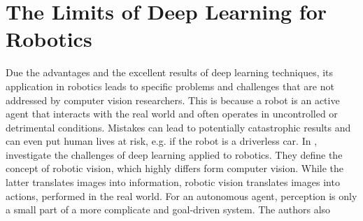 \section{The Limits of Deep Learning for Robotics}
 
 Due the advantages and the excellent results of deep learning techniques, its application in robotics leads to specific problems and challenges that are not addressed by computer vision researchers. This is because a robot is an active agent that interacts with the real world and often operates in uncontrolled or detrimental conditions. Mistakes can lead to potentially catastrophic results and can even put human lives at risk, e.g. if the robot is a driverless car. In \cite{surveydeeplimits}, \citeauthor{surveydeeplimits} investigate the challenges of deep learning applied to robotics. They define the concept of robotic vision, which highly differs form computer vision. While the latter translates images into information, robotic vision translates images into actions, performed in the real world. For an autonomous agent, perception is only a small part of a more complicate and goal-driven system. The authors also 
 

 